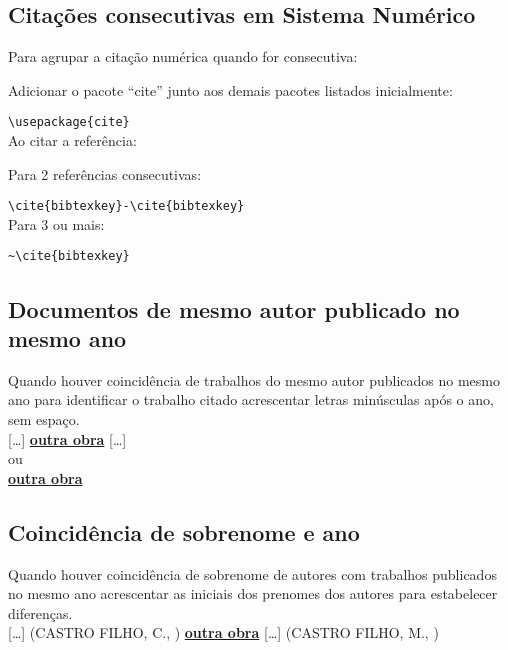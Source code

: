 \subsection{Cita\c{c}\~oes consecutivas em Sistema Num\'erico}

Para agrupar a cita\c{c}\~ao num\'erica quando for consecutiva:

Adicionar o pacote “cite” junto aos demais pacotes listados inicialmente:

\verb+\usepackage{cite}+ \\

Ao citar a refer\^encia:

Para 2 refer\^encias consecutivas: 

\verb+\cite{bibtexkey}-\cite{bibtexkey}+ \\

Para 3 ou mais: 

\verb+~\cite{bibtexkey}+ \\

\subsection{Documentos de mesmo autor publicado no mesmo ano}

Quando houver coincid\^encia de trabalhos do mesmo autor publicados
no mesmo ano para identificar o trabalho citado acrescentar letras min\'usculas ap\'os o ano, sem espa\c{c}o.\\

[\ldots] \cite{Garcia2013b}   \textbf{\underline{outra obra}}   [\ldots] \cite{Garcia2013a} \\

ou\\

  \textbf{\underline{outra obra}}   

\subsection{Coincid\^encia de sobrenome e ano}

Quando houver coincid\^encia de sobrenome de autores com trabalhos
publicados no mesmo ano acrescentar as iniciais dos prenomes dos autores
para estabelecer diferen\c{c}as.\\

[\ldots] (CASTRO FILHO, C., \citeyear{CastroC2012}) \textbf{\underline{outra obra}}   [\ldots] (CASTRO FILHO, M., \citeyear{CastroC2012}) \\

